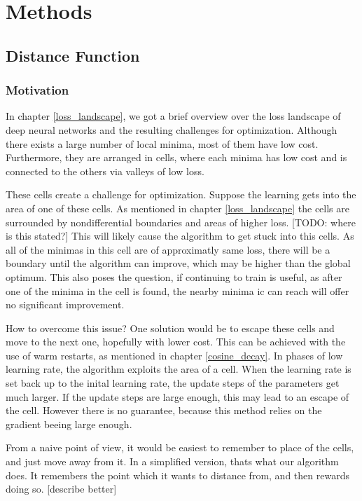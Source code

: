 \chapter{Methods}
\section{Distance Function}
\subsection{Motivation}
In chapter \ref{loss_landscape}, we got a brief overview over the loss landscape
of deep neural networks and the resulting challenges for optimization. Although
there exists a large number of local minima, most of them have low cost.
Furthermore, they are arranged in cells, where each minima has low cost and is
connected to the others via valleys of low loss.

These cells create a challenge for optimization. Suppose the learning gets into
the area of one of these cells. As mentioned in chapter \ref{loss_landscape} the
cells are surrounded by nondifferential boundaries and areas of higher loss.
[TODO: where is this stated?] This will likely cause the algorithm to get stuck
into this cells. As all of the minimas in this cell are of approximatly same
loss, there will be a boundary until the algorithm can improve, which may be
higher than the global optimum. This also poses the question, if continuing to
train is useful, as after one of the minima in the cell is found, the nearby
minima ic can reach will offer no significant improvement.

How to overcome this issue? One solution would be to escape these cells and move
to the next one, hopefully with lower cost. This can be achieved with the use of
warm restarts, as mentioned in chapter \ref{cosine_decay}. In phases of low
learning rate, the algorithm exploits the area of a cell. When the learning rate
is set back up to the inital learning rate, the update steps of the parameters
get much larger. If the update steps are large enough, this may lead to an
escape of the cell. However there is no guarantee, because this method relies on
the gradient beeing large enough.

From a naive point of view, it would be easiest to remember to place of the
cells, and just move away from it. In a simplified version, thats what our
algorithm does. It remembers the point which it wants to distance from, and then
rewards doing so. [describe better]
 
